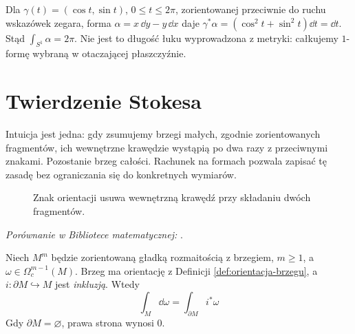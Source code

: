 \begin{przyklad}
Dla $\gamma(t)=(\cos t,\sin t)$, $0\leq t\leq2\pi$,
zorientowanej przeciwnie do ruchu wskazówek zegara,
forma $\alpha=x\,\dd y-y\,\dd x$ daje
$\gamma^*\alpha=(\cos^2t+\sin^2t)\dd t=\dd t$.
Stąd $\int_{S^1}\alpha=2\pi$.
Nie jest to długość łuku wyprowadzona z metryki:
całkujemy $1$-formę wybraną w otaczającej płaszczyźnie.
\end{przyklad}

\section{Twierdzenie Stokesa}
\label{sec:formy-stokes}

Intuicja jest jedna: gdy zsumujemy brzegi
małych, zgodnie zorientowanych fragmentów,
ich wewnętrzne krawędzie wystąpią po dwa razy
z przeciwnymi znakami. Pozostanie brzeg całości.
Rachunek na formach pozwala zapisać tę zasadę
bez ograniczania się do konkretnych wymiarów.

\begin{figure}[!htbp]
\centering
{}
\caption{Znak orientacji usuwa wewnętrzną krawędź
przy składaniu dwóch fragmentów.}
\label{fig:stokes-anulowanie}
\end{figure}

\noindent\emph{Porównanie w Bibliotece matematycznej:} .

\begin{twierdzenie}
\label{thm:stokes-formy}
Niech $M^m$ będzie zorientowaną gładką rozmaitością
z brzegiem, $m\geq1$, a $\omega\in\Omega_c^{m-1}(M)$.
Brzeg ma orientację z Definicji
\ref{def:orientacja-brzegu}, a
$i:\partial M\hookrightarrow M$ jest \emph{inkluzją}.
Wtedy
\begin{equation}\label{eq:stokes-formy}
 \int_M\dd\omega
        =\int_{\partial M}i^*\omega
\end{equation}
Gdy $\partial M=\varnothing$, prawa strona wynosi $0$.
\end{twierdzenie}

